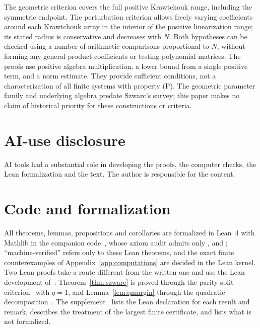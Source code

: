The geometric criterion covers the full positive Krawtchouk range, including the symmetric endpoint. The perturbation criterion allows freely varying coefficients around each Krawtchouk array in the interior of the positive linearization range; its stated radius is conservative and decreases with $N$. Both hypotheses can be checked using a number of arithmetic comparisons proportional to $N$, without forming any general product coefficients or testing polynomial matrices. The proofs use positive algebra multiplication, a lower bound from a single positive term, and a norm estimate. They provide sufficient conditions, not a characterization of all finite systems with property (P). The geometric parameter family and underlying algebra predate Szwarc's survey; this paper makes no claim of historical priority for these constructions or criteria.

\section*{AI-use disclosure}

AI tools had a substantial role in developing the proofs, the computer checks, the Lean formalization and the text. The author is responsible for the content.

\section*{Code and formalization}

All theorems, lemmas, propositions and corollaries are formalized in Lean~4 with Mathlib in the companion code~\cite{code}, whose axiom audit admits only ,  and ; ``machine-verified'' refers only to these Lean theorems, and the exact finite counterexamples of Appendix~\ref{app:computations} are decided in the Lean kernel. Two Lean proofs take a route different from the written one and use the Lean development of~\cite{P1}: Theorem~\ref{thm:szwarc} is proved through the parity-split criterion~\cite[Corollary~]{P1} with $q=1$, and Lemma~\ref{lem:qmargin} through the quadratic decomposition~\cite[Theorem~]{P1}. The supplement~\cite{supp} lists the Lean declaration for each result and remark, describes the treatment of the largest finite certificate, and lists what is not formalized.

